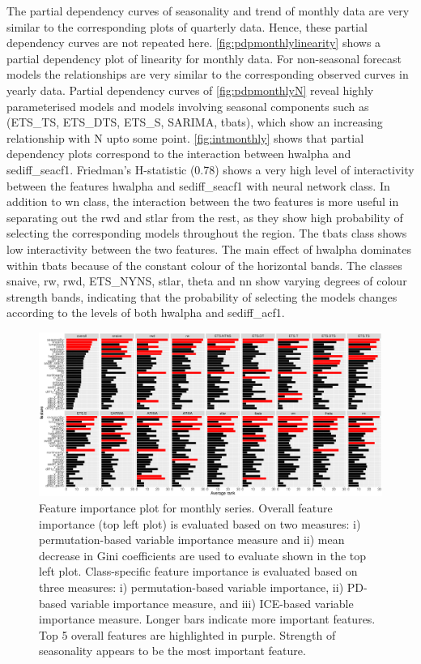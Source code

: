 \documentclass[11pt,a4paper,]{article}
\begin{document}
The partial dependency curves of seasonality and trend of monthly data are very similar to the corresponding plots of quarterly data. Hence, these partial dependency curves are not repeated here. \autoref{fig:pdpmonthlylinearity} shows a partial dependency plot of linearity for monthly data. For non-seasonal forecast models the relationships are very similar to the corresponding observed curves in yearly data. Partial dependency curves of \autoref{fig:pdpmonthlyN} reveal highly parameterised models and models involving seasonal components such as (ETS\_TS, ETS\_DTS, ETS\_S, SARIMA, tbats), which show an increasing relationship with N upto some point. \autoref{fig:intmonthly} shows that partial dependency plots correspond to the interaction between hwalpha and sediff\_seacf1. Friedman's H-statistic (0.78) shows a very high level of interactivity between the features hwalpha and sediff\_seacf1 with neural network class. In addition to wn class, the interaction between the two features is more useful in separating out the rwd and stlar from the rest, as they show high probability of selecting the corresponding models throughout the region. The tbats class shows low interactivity between the two features. The main effect of hwalpha dominates within tbats because of the constant colour of the horizontal bands. The classes snaive, rw, rwd, ETS\_NYNS, stlar, theta and nn show varying degrees of colour strength bands, indicating that the probability of selecting the models changes according to the levels of both hwalpha and sediff\_acf1.

\begin{figure}
\centering
\includegraphics{figures/vimonthly-1.pdf}
\caption{\label{fig:vimonthly}Feature importance plot for monthly series. Overall feature importance (top left plot) is evaluated based on two measures: i) permutation-based variable importance measure and ii) mean decrease in Gini coefficients are used to evaluate shown in the top left plot. Class-specific feature importance is evaluated based on three measures: i) permutation-based variable importance, ii) PD-based variable importance measure, and iii) ICE-based variable importance measure. Longer bars indicate more important features. Top 5 overall features are highlighted in purple. Strength of seasonality appears to be the most important feature.}
\end{figure}
\end{document}
